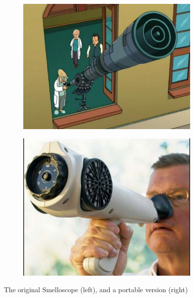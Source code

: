 \documentclass[singlespace]{../unmthesis}
\begin{document}
\begin{figure}[ht]
\centering
\begin{subfigure}[b]{0.4\textwidth}
\includegraphics[width=\textwidth]{./figures/smelloscope01}
\end{subfigure}
\hfill
\begin{subfigure}[b]{0.4\textwidth}
\includegraphics[width=\textwidth]{./figures/smelloscope03}
\end{subfigure}
\caption{The original Smelloscope (left), and a portable version (right)}
\label{fig:smelloscope}
\end{figure}
\end{document}
